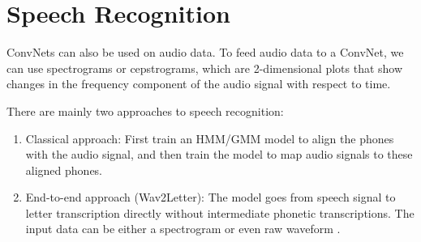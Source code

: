 \section{Speech Recognition}
ConvNets can also be used on audio data. To feed audio data to a ConvNet, we can use spectrograms or cepstrograms, which are 2-dimensional plots that show changes in the frequency component of the audio signal with respect to time.

There are mainly two approaches to speech recognition:
\begin{enumerate}
    \item Classical approach: First train an HMM/GMM model to align the phones with the audio signal, and then train the model to map audio signals to these aligned phones.
    \item End-to-end approach (Wav2Letter): The model goes from speech signal to letter transcription directly without intermediate phonetic transcriptions. The input data can be either a spectrogram or even raw waveform \cite{Collobert2017Wav2LetterAE}.
\end{enumerate}